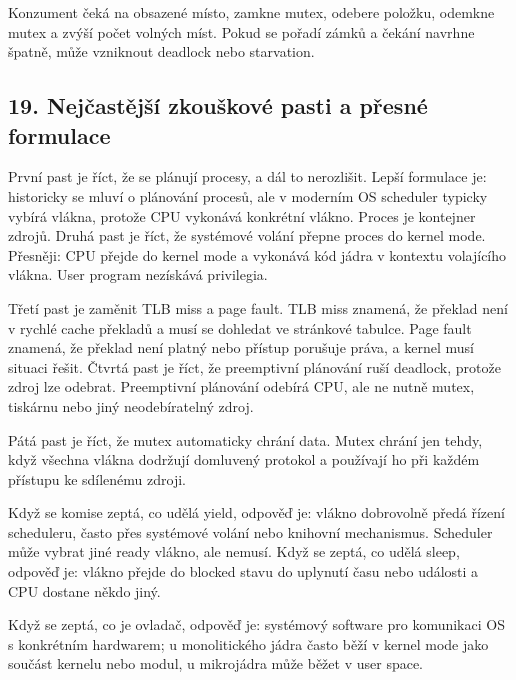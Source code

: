 Konzument čeká na obsazené místo, zamkne mutex, odebere položku, odemkne mutex a zvýší počet volných míst. Pokud se pořadí zámků a čekání navrhne špatně, může vzniknout deadlock nebo starvation.

\subsection*{19. Nejčastější zkouškové pasti a přesné formulace}

První past je říct, že se plánují procesy, a dál to nerozlišit. Lepší formulace je: historicky se mluví o plánování procesů, ale v moderním OS scheduler typicky vybírá vlákna, protože CPU vykonává konkrétní vlákno. Proces je kontejner zdrojů. Druhá past je říct, že systémové volání přepne proces do kernel mode. Přesněji: CPU přejde do kernel mode a vykonává kód jádra v kontextu volajícího vlákna. User program nezískává privilegia.

Třetí past je zaměnit TLB miss a page fault. TLB miss znamená, že překlad není v rychlé cache překladů a musí se dohledat ve stránkové tabulce. Page fault znamená, že překlad není platný nebo přístup porušuje práva, a kernel musí situaci řešit. Čtvrtá past je říct, že preemptivní plánování ruší deadlock, protože zdroj lze odebrat. Preemptivní plánování odebírá CPU, ale ne nutně mutex, tiskárnu nebo jiný neodebíratelný zdroj.

Pátá past je říct, že mutex automaticky chrání data. Mutex chrání jen tehdy, když všechna vlákna dodržují domluvený protokol a používají ho při každém přístupu ke sdílenému zdroji.

Když se komise zeptá, co udělá yield, odpověď je: vlákno dobrovolně předá řízení scheduleru, často přes systémové volání nebo knihovní mechanismus. Scheduler může vybrat jiné ready vlákno, ale nemusí. Když se zeptá, co udělá sleep, odpověď je: vlákno přejde do blocked stavu do uplynutí času nebo události a CPU dostane někdo jiný.

Když se zeptá, co je ovladač, odpověď je: systémový software pro komunikaci OS s konkrétním hardwarem; u monolitického jádra často běží v kernel mode jako součást kernelu nebo modul, u mikrojádra může běžet v user space.

\newpage

